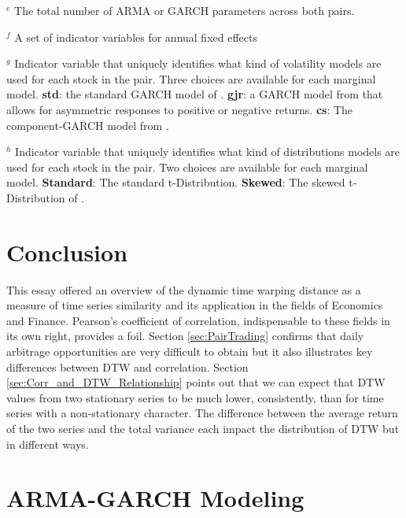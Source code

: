 \begin{table}
\begin{tablenotes}
        \item {$^{e}$ The total number of ARMA or GARCH parameters across both pairs.}
        \item {$^{f}$ A set of indicator variables for annual fixed effects}
        \item {$^{g}$ Indicator variable that uniquely identifies what kind of volatility models are used for each stock in the pair. Three choices are available for each marginal model. \textbf{std}: the standard GARCH model of \cite{Bollerslev1986Garch}. \textbf{gjr}: a GARCH model from \cite{GJR_1993} that allows for asymmetric responses to positive or negative returns. \textbf{cs}: The component-GARCH model from \cite{EngleLee1993APA}.}
        \item {$^{h}$ Indicator variable that uniquely identifies what kind of distributions models are used for each stock in the pair. Two choices are available for each marginal model. \textbf{Standard}: The standard t-Distribution. \textbf{Skewed}: The skewed t-Distribution of \cite{Fernandez_Steel_1998}.}
    \end{tablenotes}
    \label{tbl:correlation_to_log_dtw_regression_pearson}
\end{table}

\section{Conclusion} \label{sec:Conclusion}

This essay offered an overview of the dynamic time warping distance as a measure of time series similarity and its application in the fields of Economics and Finance. Pearson's coefficient of correlation, indispensable to these fields in its own right, provides a foil. Section \ref{sec:PairTrading} confirms that daily arbitrage opportunities are very difficult to obtain but it also illustrates key differences between DTW and correlation. Section \ref{sec:Corr_and_DTW_Relationship} points out that we can expect that DTW values from two stationary series to be much lower, consistently, than for time series with a non-stationary character. The difference between the average return of the two series and the total variance each impact the distribution of DTW but in different ways.  


\appendix 

\section{ARMA-GARCH Modeling} \label{sec:ARMAGARCH-benchmark}

